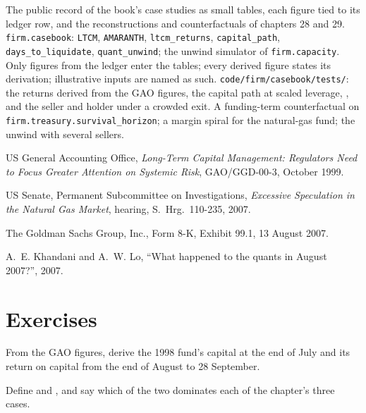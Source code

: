 \begin{build}
 The public record of the book's case studies as small tables, each figure tied to its ledger row, and the reconstructions and
counterfactuals of chapters 28 and 29.
 \texttt{firm.casebook}: \texttt{LTCM}, \texttt{AMARANTH}, \texttt{ltcm\_returns}, \texttt{capital\_path},
\texttt{days\_to\_liquidate}, \texttt{quant\_unwind}; the unwind simulator of \texttt{firm.capacity}.
 Only figures from the ledger enter the tables; every derived figure states its derivation; illustrative inputs are named as such.
 \texttt{code/firm/casebook/tests/}: the returns derived from the GAO figures, the capital path at scaled leverage, , and the seller and holder under a crowded exit.
 A funding-term counterfactual on \texttt{firm.treasury.survival\_horizon}; a margin spiral for the natural-gas fund; the unwind with
several sellers.
\end{build}

\begin{omsources}
\item US General Accounting Office, \emph{Long-Term Capital Management: Regulators Need to Focus Greater Attention on Systemic Risk},
GAO/GGD-00-3, October 1999.
\item US Senate, Permanent Subcommittee on Investigations, \emph{Excessive Speculation in the Natural Gas Market}, hearing, S.~Hrg.~110-235, 2007.
\item The Goldman Sachs Group, Inc., Form 8-K, Exhibit 99.1, 13 August 2007.
\item A.~E. Khandani and A.~W. Lo, ``What happened to the quants in August 2007?'', 2007.
\end{omsources}

\section{Exercises}

\begin{exercise}[$\star$]\label{exo:fm:case-studies-i:1}
From the GAO figures, derive the 1998 fund's capital at the end of July and its return on capital from the end of August to 28 September.
\end{exercise}

\begin{exercise}[$\star$]\label{exo:fm:case-studies-i:2}
Define  and , and say which of the two dominates each of the chapter's three cases.
\end{exercise}

